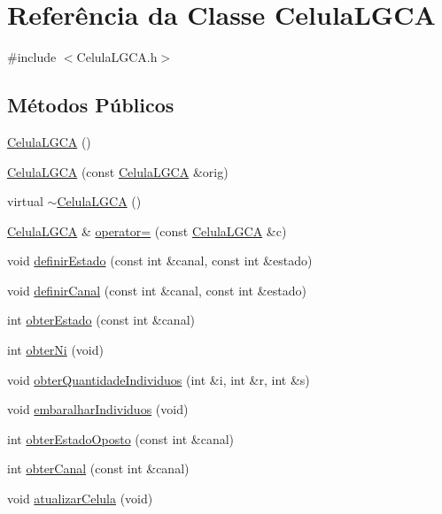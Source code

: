 \hypertarget{class_celula_l_g_c_a}{
\section{Referência da Classe CelulaLGCA}
\label{class_celula_l_g_c_a}
}


{\ttfamily \#include $<$CelulaLGCA.h$>$}

\subsection*{Métodos Públicos}
\begin{DoxyCompactItemize}
\item 
\hyperlink{class_celula_l_g_c_a_a52767adf8cfd8cfc869aec355c35fac0}{CelulaLGCA} ()
\item 
\hyperlink{class_celula_l_g_c_a_a618ab083b170b0505f7ec07f9e0fb587}{CelulaLGCA} (const \hyperlink{class_celula_l_g_c_a}{CelulaLGCA} \&orig)
\item 
virtual \hyperlink{class_celula_l_g_c_a_ab4ef33f8d6639215db3c812bb363bb68}{$\sim$CelulaLGCA} ()
\item 
\hyperlink{class_celula_l_g_c_a}{CelulaLGCA} \& \hyperlink{class_celula_l_g_c_a_abf258dcce1b6050e38bd9f8f52809910}{operator=} (const \hyperlink{class_celula_l_g_c_a}{CelulaLGCA} \&c)
\item 
void \hyperlink{class_celula_l_g_c_a_add0a2e26fe28d849fdbddd833193195a}{definirEstado} (const int \&canal, const int \&estado)
\item 
void \hyperlink{class_celula_l_g_c_a_a3cb0cad5455b24b65b19546c3c106c8f}{definirCanal} (const int \&canal, const int \&estado)
\item 
int \hyperlink{class_celula_l_g_c_a_abd7206505d13b59950e2a7acd7ea81e9}{obterEstado} (const int \&canal)
\item 
int \hyperlink{class_celula_l_g_c_a_a765719e7d27cbf7644fdc938a47792d1}{obterNi} (void)
\item 
void \hyperlink{class_celula_l_g_c_a_a784f3d9f05aaca8acfd8bafee6a08e86}{obterQuantidadeIndividuos} (int \&i, int \&r, int \&s)
\item 
void \hyperlink{class_celula_l_g_c_a_a67069fbfc061a3cb4775f5dc3bb6cb72}{embaralharIndividuos} (void)
\item 
int \hyperlink{class_celula_l_g_c_a_a9e4484facaa4a58f12fdbbc03c60d252}{obterEstadoOposto} (const int \&canal)
\item 
int \hyperlink{class_celula_l_g_c_a_a254a52a876e23cdc38a03c903190d176}{obterCanal} (const int \&canal)
\item 
void \hyperlink{class_celula_l_g_c_a_aca6db88c84fb8d218d0b89b7ce375719}{atualizarCelula} (void)
\end{DoxyCompactItemize}
